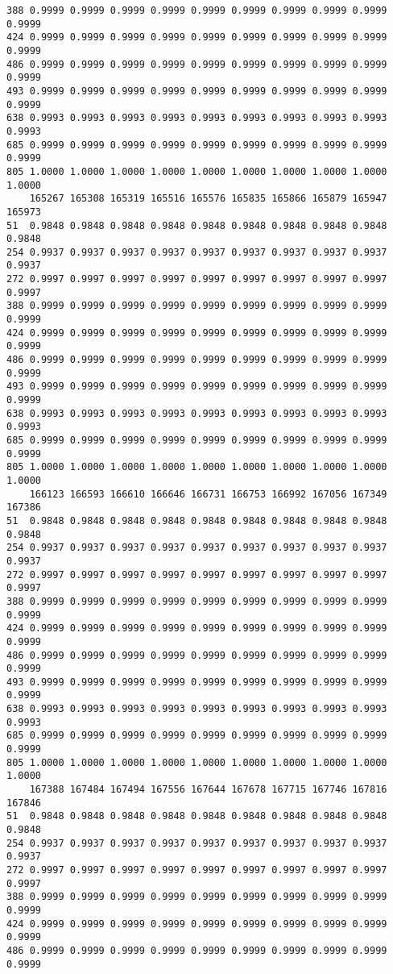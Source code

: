 \documentclass[
]{report}
\begin{document}
\begin{verbatim}
388 0.9999 0.9999 0.9999 0.9999 0.9999 0.9999 0.9999 0.9999 0.9999 0.9999
424 0.9999 0.9999 0.9999 0.9999 0.9999 0.9999 0.9999 0.9999 0.9999 0.9999
486 0.9999 0.9999 0.9999 0.9999 0.9999 0.9999 0.9999 0.9999 0.9999 0.9999
493 0.9999 0.9999 0.9999 0.9999 0.9999 0.9999 0.9999 0.9999 0.9999 0.9999
638 0.9993 0.9993 0.9993 0.9993 0.9993 0.9993 0.9993 0.9993 0.9993 0.9993
685 0.9999 0.9999 0.9999 0.9999 0.9999 0.9999 0.9999 0.9999 0.9999 0.9999
805 1.0000 1.0000 1.0000 1.0000 1.0000 1.0000 1.0000 1.0000 1.0000 1.0000
    165267 165308 165319 165516 165576 165835 165866 165879 165947 165973
51  0.9848 0.9848 0.9848 0.9848 0.9848 0.9848 0.9848 0.9848 0.9848 0.9848
254 0.9937 0.9937 0.9937 0.9937 0.9937 0.9937 0.9937 0.9937 0.9937 0.9937
272 0.9997 0.9997 0.9997 0.9997 0.9997 0.9997 0.9997 0.9997 0.9997 0.9997
388 0.9999 0.9999 0.9999 0.9999 0.9999 0.9999 0.9999 0.9999 0.9999 0.9999
424 0.9999 0.9999 0.9999 0.9999 0.9999 0.9999 0.9999 0.9999 0.9999 0.9999
486 0.9999 0.9999 0.9999 0.9999 0.9999 0.9999 0.9999 0.9999 0.9999 0.9999
493 0.9999 0.9999 0.9999 0.9999 0.9999 0.9999 0.9999 0.9999 0.9999 0.9999
638 0.9993 0.9993 0.9993 0.9993 0.9993 0.9993 0.9993 0.9993 0.9993 0.9993
685 0.9999 0.9999 0.9999 0.9999 0.9999 0.9999 0.9999 0.9999 0.9999 0.9999
805 1.0000 1.0000 1.0000 1.0000 1.0000 1.0000 1.0000 1.0000 1.0000 1.0000
    166123 166593 166610 166646 166731 166753 166992 167056 167349 167386
51  0.9848 0.9848 0.9848 0.9848 0.9848 0.9848 0.9848 0.9848 0.9848 0.9848
254 0.9937 0.9937 0.9937 0.9937 0.9937 0.9937 0.9937 0.9937 0.9937 0.9937
272 0.9997 0.9997 0.9997 0.9997 0.9997 0.9997 0.9997 0.9997 0.9997 0.9997
388 0.9999 0.9999 0.9999 0.9999 0.9999 0.9999 0.9999 0.9999 0.9999 0.9999
424 0.9999 0.9999 0.9999 0.9999 0.9999 0.9999 0.9999 0.9999 0.9999 0.9999
486 0.9999 0.9999 0.9999 0.9999 0.9999 0.9999 0.9999 0.9999 0.9999 0.9999
493 0.9999 0.9999 0.9999 0.9999 0.9999 0.9999 0.9999 0.9999 0.9999 0.9999
638 0.9993 0.9993 0.9993 0.9993 0.9993 0.9993 0.9993 0.9993 0.9993 0.9993
685 0.9999 0.9999 0.9999 0.9999 0.9999 0.9999 0.9999 0.9999 0.9999 0.9999
805 1.0000 1.0000 1.0000 1.0000 1.0000 1.0000 1.0000 1.0000 1.0000 1.0000
    167388 167484 167494 167556 167644 167678 167715 167746 167816 167846
51  0.9848 0.9848 0.9848 0.9848 0.9848 0.9848 0.9848 0.9848 0.9848 0.9848
254 0.9937 0.9937 0.9937 0.9937 0.9937 0.9937 0.9937 0.9937 0.9937 0.9937
272 0.9997 0.9997 0.9997 0.9997 0.9997 0.9997 0.9997 0.9997 0.9997 0.9997
388 0.9999 0.9999 0.9999 0.9999 0.9999 0.9999 0.9999 0.9999 0.9999 0.9999
424 0.9999 0.9999 0.9999 0.9999 0.9999 0.9999 0.9999 0.9999 0.9999 0.9999
486 0.9999 0.9999 0.9999 0.9999 0.9999 0.9999 0.9999 0.9999 0.9999 0.9999

\end{verbatim}
\end{document}
